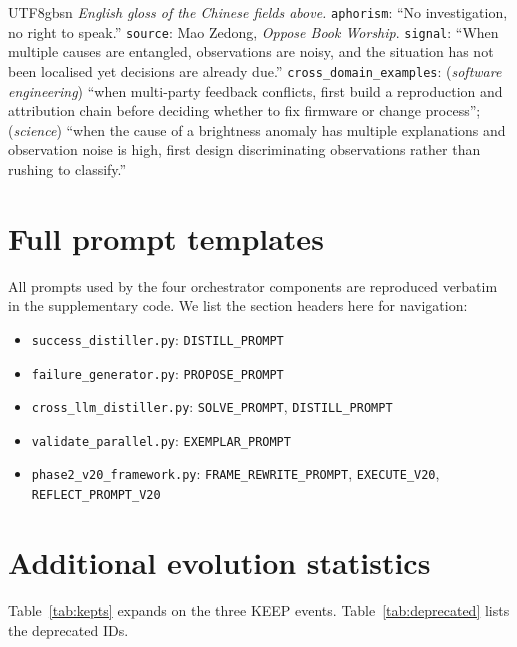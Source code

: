 \documentclass{article}
\begin{document}
\begin{CJK*}{UTF8}{gbsn}
\emph{English gloss of the Chinese fields above.}
\texttt{aphorism}: ``No investigation, no right to speak.''
\texttt{source}: Mao Zedong, \emph{Oppose Book Worship}.
\texttt{signal}: ``When multiple causes are entangled, observations
are noisy, and the situation has not been localised yet decisions
are already due.''
\texttt{cross\_domain\_examples}: (\emph{software engineering})
``when multi-party feedback conflicts, first build a reproduction
and attribution chain before deciding whether to fix firmware or
change process''; (\emph{science}) ``when the cause of a brightness
anomaly has multiple explanations and observation noise is high,
first design discriminating observations rather than rushing to
classify.''

\section{Full prompt templates}
\label{app:prompts}

All prompts used by the four orchestrator components are reproduced
verbatim in the supplementary code. We list the section headers here
for navigation:

\begin{itemize}[leftmargin=*]
  \item \texttt{success\_distiller.py}: \texttt{DISTILL\_PROMPT}
  \item \texttt{failure\_generator.py}: \texttt{PROPOSE\_PROMPT}
  \item \texttt{cross\_llm\_distiller.py}:
    \texttt{SOLVE\_PROMPT}, \texttt{DISTILL\_PROMPT}
  \item \texttt{validate\_parallel.py}: \texttt{EXEMPLAR\_PROMPT}
  \item \texttt{phase2\_v20\_framework.py}:
    \texttt{FRAME\_REWRITE\_PROMPT}, \texttt{EXECUTE\_V20},
    \texttt{REFLECT\_PROMPT\_V20}
\end{itemize}

\section{Additional evolution statistics}
\label{app:stats}

Table~\ref{tab:kepts} expands on the three KEEP events.
Table~\ref{tab:deprecated} lists the deprecated IDs.


\end{CJK*}
\end{document}
